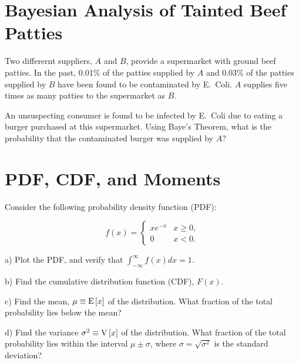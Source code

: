 \documentclass[11pt,letterpaper,notitlepage,onesided]{nwh_hw}
\begin{document}
\section{Bayesian Analysis of Tainted Beef Patties}

Two differernt suppliers, $A$ and $B$, provide a supermarket with
ground beef patties.  In the past, 0.01\% of the patties supplied by
$A$ and 0.03\% of the patties supplied by $B$ have been found to be
contaminated by E.\ Coli. $A$ supplies five times as many patties to
the supermarket as $B$. 

An unsuspecting consumer is found to be infected by E.\ Coli due to
eating a burger purchased at this supermarket. Using Baye's Theorem,
what is the probability that the contaminated burger was supplied by
$A$?


\section{PDF, CDF, and Moments}

Consider the following probability density function (PDF): 

\[ 
f (x) = \begin{cases}
  x e^{-x} &  x \geq 0, \\
  0 & x < 0.
\end{cases}
\]

a) Plot the PDF, and verify that $\int_{-\infty}^\infty f(x) dx = 1$.

b) Find the cumulative distribution function (CDF), $F(x)$.

c) Find the mean, $\mu \equiv \mathrm{E}\left[ x \right] $ of the distribution. What fraction of the total probability lies below the mean? 

d) Find the variance $\sigma^2 \equiv \mathrm{V}\left[ x \right]$ of the distribution. What fraction of the total probability lies within the interval $\mu \pm \sigma$, where $\sigma = \sqrt{\sigma^2}$ is the standard deviation? 
\end{document}
